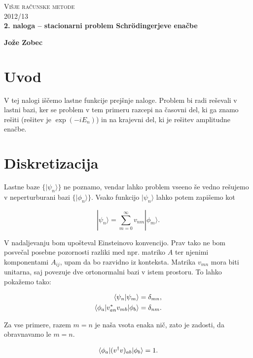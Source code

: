 \documentclass[a4 paper, 12pt]{article}
\begin{document}
\begin{center}
\textsc{Višje računske metode}\\
\textsc{2012/13}\\[0.5cm]
\textbf{2. naloga -- stacionarni problem Schr\" odingerjeve enačbe}
\end{center}
\begin{flushright}
\textbf{Jože Zobec}
\end{flushright}

\section{Uvod}

V tej nalogi iščemo lastne funkcije prejšnje naloge. Problem bi radi reševali v lastni bazi,
ker se problem v tem primeru razcepi na časovni del, ki ga znamo rešiti (rešitev je
$\exp(-iE_n)$) in na krajevni del, ki je rešitev amplitudne enačbe.

\section{Diskretizacija}

Lastne baze $\big\{|\psi_n\rangle\big\}$ ne poznamo, vendar lahko problem vseeno še vedno
rešujemo v neperturburani bazi $\big\{|\phi_n\rangle\big\}$. Vsako funkcijo $|\psi_n\rangle$
lahko potem zapišemo kot

\[
	|\psi_n\rangle = \sum_{m=0}^\infty v_{nm}|\phi_m\rangle.
\]

V nadaljevanju bom upošteval Einsteinovo konvencijo. Prav tako ne bom posvečal posebne
pozornosti razliki med npr. matriko $A$ ter njenimi komponentami $A_{ij}$, upam da bo razvidno
iz konteksta. Matrika $v_{mn}$ mora biti unitarna, saj povezuje dve ortonormalni bazi v istem prostoru.
To lahko pokažemo tako:

\begin{align}
	\langle\psi_n|\psi_m\rangle &= \delta_{mn}, \notag \\
	\langle\phi_a| v^*_{an} v_{mb} |\phi_b\rangle &= \delta_{nm}. \label{norm}
\end{align}

Za vse primere, razem $m = n$ je naša vsota enaka nič, zato je zadosti, da obravnavamo le 
$m = n$.

\begin{equation}
	\langle\phi_a| (v^\dagger v)_{ab} |\phi_b\rangle = 1. \\
	\label{stuff}
\end{equation}
\end{document}
